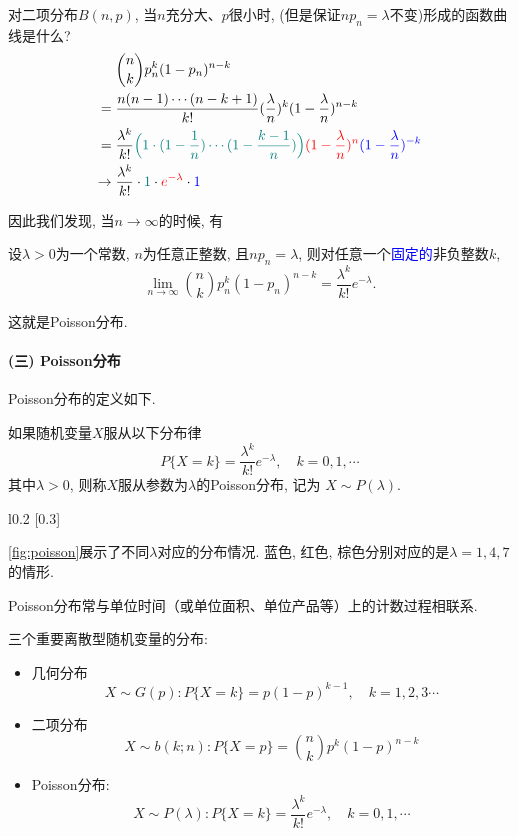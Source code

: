 对二项分布$B(n,p)$, 当$n$充分大、$p$很小时, (但是保证$np_n=\lambda$不变)形成的函数曲线是什么?
\begin{align*}
                   & {n \choose k}p_n^k(1-p_n)^{n-k}                                                                                                                                                    \\
    ={}            & \frac{n(n-1)\cdots (n-k+1)}{k!}(\frac{\lambda}{n})^k(1-\frac{\lambda}{n})^{n-k}                                                                                                    \\
    ={}            & \frac{\lambda^k}{k!}\textcolor{teal}{\Big(1\cdot (1-\frac{1}{n})\cdots (1-\frac{k-1}{n})\Big)}\textcolor{red}{(1-\frac{\lambda}{n})^n}\textcolor{blue}{(1-\frac{\lambda}{n})^{-k}} \\
    \rightarrow {} & \frac{\lambda^k}{k!}\cdot \textcolor{teal}{1}\cdot \textcolor{red}{e^{-\lambda}}\cdot \textcolor{blue}{1}
\end{align*}

因此我们发现, 当$n\to\infty$的时候, 有
\begin{theorem}
    设$\lambda>0$为一个常数, $n$为任意正整数, 且$np_n=\lambda$, 则对任意一个\textcolor{blue}{固定的}非负整数$k$, 
    $$
        \lim_{n\rightarrow \infty}{n\choose k}p_n^k(1-p_n)^{n-k}=\frac{\lambda^k}{k!}e^{-\lambda}.
    $$
\end{theorem}
这就是Poisson分布.

\paragraph{(三) Poisson分布}

Poisson分布的定义如下.
\begin{definition}[Poisson分布]
    如果随机变量$X$服从以下分布律
    \[ P\{X=k\}=\frac{\lambda^k}{k!}e^{-\lambda},\quad k=0,1,\cdots \]
    其中$\lambda>0$, 则称$X$服从参数为$\lambda$的Poisson分布, 记为
    $X\sim P(\lambda).$
\end{definition}%
\begin{wrapfigure}{l}{0.2\textwidth}
    \scalebox{0.3}[0.3]{ }
    \caption{Poisson分布}
    \label{fig:poisson}
\end{wrapfigure}
\cref{fig:poisson}展示了不同$\lambda$对应的分布情况. 蓝色, 红色, 棕色分别对应的是$\lambda=1,4,7$的情形.

Poisson分布常与单位时间（或单位面积、单位产品等）上的计数过程相联系.


\begin{takeaway}
    三个重要离散型随机变量的分布:
    \begin{itemize}
        \item 几何分布$$X\sim G(p): P\{X=k\}=p(1-p)^{k-1}, \quad k=1,2,3 \cdots$$
        \item 二项分布$$X\sim b(k ; n): P\{X=p\}=\binom nk p^k(1-p)^{n-k}$$
        \item Poisson分布: $$X\sim P(\lambda): P\{X=k\}=\frac{\lambda^k}{k !} e^{-\lambda}, \quad k=0,1, \cdots$$
    \end{itemize}
\end{takeaway}